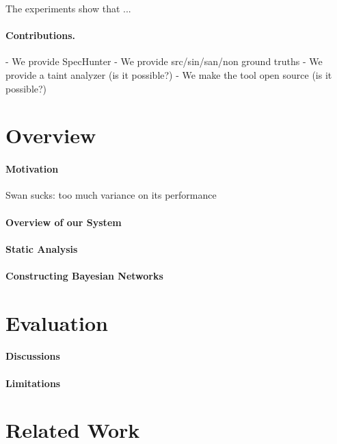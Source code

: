 \documentclass[acmsmall,review,anonymous]{acmart}\settopmatter{printfolios=true,printccs=false,printacmref=false}
\begin{document}
The experiments show that ...   %

\paragraph{Contributions.}

- We provide SpecHunter
- We provide src/sin/san/non ground truths
- We provide a taint analyzer (is it possible?)
- We make the tool open source (is it possible?)

\section{Overview}

\paragraph{Motivation}

Swan sucks: too much variance on its performance

\paragraph{Overview of our System}


\paragraph{Static Analysis}


\paragraph{Constructing Bayesian Networks}


\section{Evaluation}

\paragraph{Discussions}

\paragraph{Limitations}


\section{Related Work}
\end{document}
